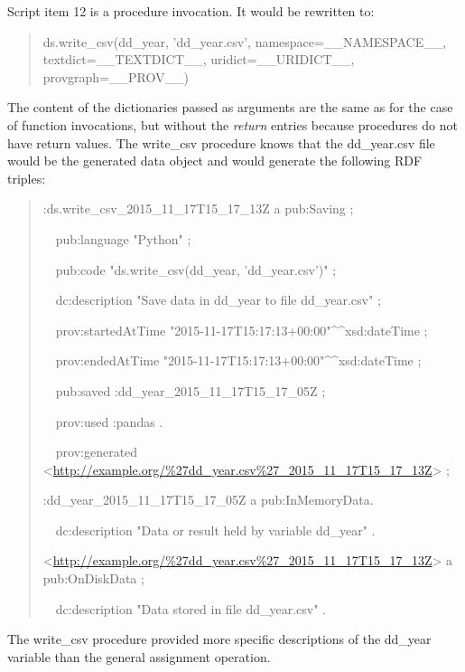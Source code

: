 Script item 12 is a procedure invocation. It would be rewritten to:
\begin{quotation}
	\noindent ds.write\_csv(dd\_year, 'dd\_year.csv', namespace=\_\_NAMESPACE\_\_, textdict=\_\_TEXTDICT\_\_, uridict=\_\_URIDICT\_\_, provgraph=\_\_PROV\_\_)
\end{quotation}
The content of the dictionaries passed as arguments are the same as for the case of function invocations, but without the \emph{return} entries because procedures do not have return values. The write\_csv procedure knows that the dd\_year.csv file would be the generated data object and would generate the following RDF triples:
\begin{quotation}
	\noindent:ds.write\_csv\_2015\_11\_17T15\_17\_13Z a pub:Saving ;
	
	\noindent\ \ pub:language "Python" ;
	
	\noindent\ \ pub:code "ds.write\_csv(dd\_year, 'dd\_year.csv')" ;
	
	\noindent\ \ dc:description "Save data in dd\_year to file dd\_year.csv" ;
	
	\noindent\ \ prov:startedAtTime "2015-11-17T15:17:13+00:00"\^{}\^{}xsd:dateTime ;
	
	\noindent\ \ prov:endedAtTime "2015-11-17T15:17:13+00:00"\^{}\^{}xsd:dateTime ;
	
	\noindent\ \ pub:saved :dd\_year\_2015\_11\_17T15\_17\_05Z ;

	\noindent\ \ prov:used :pandas .
	
	\noindent\ \ prov:generated <\url{http://example.org/%27dd_year.csv%27_2015_11_17T15_17_13Z}> ;
	
	\noindent:dd\_year\_2015\_11\_17T15\_17\_05Z a pub:InMemoryData.
	
	\noindent\ \ dc:description "Data or result held by variable dd\_year" .
	
	\noindent<\url{http://example.org/%27dd_year.csv%27_2015_11_17T15_17_13Z}> a pub:OnDiskData ;
	
	\noindent\ \ dc:description "Data stored in file dd\_year.csv" .
\end{quotation}
The write\_csv procedure provided more specific descriptions of the dd\_year variable than the general assignment operation.

